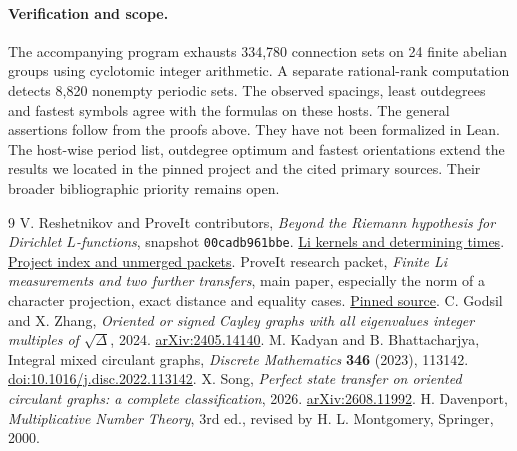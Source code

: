 \documentclass[11pt]{article}
\newcommand{\repo}{https://github.com/VladimirReshetnikov/ProveIt/blob/00cadb961bbe77c74e5d082c4948f8884d58a970/Analysis/GeneralizedRiemannHypothesis}
\begin{document}
\paragraph{Verification and scope.} The accompanying program exhausts 334,780 connection sets on 24 finite abelian groups using cyclotomic integer arithmetic. A separate rational-rank computation detects 8,820 nonempty periodic sets. The observed spacings, least outdegrees and fastest symbols agree with the formulas on these hosts. The general assertions follow from the proofs above. They have not been formalized in Lean. The host-wise period list, outdegree optimum and fastest orientations extend the results we located in the pinned project and the cited primary sources. Their broader bibliographic priority remains open.

\begin{thebibliography}{9}
 V. Reshetnikov and ProveIt contributors, \emph{Beyond the Riemann hypothesis for Dirichlet $L$-functions}, snapshot \texttt{00cadb961bbe}. \href{\repo/Article/sections/li.tex}{Li kernels and determining times}. \href{\repo/README.md}{Project index and unmerged packets}.
 ProveIt research packet, \emph{Finite Li measurements and two further transfers}, main paper, especially the norm of a character projection, exact distance and equality cases. \href{\repo/Research/dirichlet_li_recovery/heat.tex}{Pinned source}.
 C. Godsil and X. Zhang, \emph{Oriented or signed Cayley graphs with all eigenvalues integer multiples of $\sqrt\Delta$}, 2024. \href{https://arxiv.org/abs/2405.14140}{arXiv:2405.14140}.
 M. Kadyan and B. Bhattacharjya, Integral mixed circulant graphs, \emph{Discrete Mathematics} \textbf{346} (2023), 113142. \href{https://doi.org/10.1016/j.disc.2022.113142}{doi:10.1016/j.disc.2022.113142}.
 X. Song, \emph{Perfect state transfer on oriented circulant graphs: a complete classification}, 2026. \href{https://arxiv.org/abs/2608.11992}{arXiv:2608.11992}.
 H. Davenport, \emph{Multiplicative Number Theory}, 3rd ed., revised by H. L. Montgomery, Springer, 2000.
\end{thebibliography}
\end{document}
